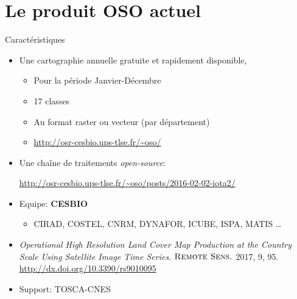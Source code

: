 \documentclass[pressentation,10pt,aspectratio=1610, xcolor=table]{beamer}
\begin{document}
\section{Le produit OSO actuel}
\label{sec:org7da76dc}
\begin{frame}[label={sec:org039e2ee}]{Caractéristiques}
\begin{itemize}
\item Une cartographie annuelle gratuite et rapidement disponible,
\begin{itemize}
\item Pour la période \og Janvier-Décembre\fg
\item 17 classes
\item Au format raster ou vecteur (par département)
\item \url{http://osr-cesbio.ups-tlse.fr/\~oso/}
\end{itemize}
\item Une chaîne de traitements \emph{open-source}:
\begin{center}
\url{http://osr-cesbio.ups-tlse.fr/\~oso/posts/2016-02-02-iota2/} 
\end{center}
\item Equipe: \textbf{CESBIO}
\begin{itemize}
\item CIRAD, COSTEL, CNRM, DYNAFOR, ICUBE, ISPA, MATIS \ldots{}
\end{itemize}
\item \emph{Operational High Resolution Land Cover Map Production at the Country
Scale Using Satellite Image  Time Series}.  \(\textsc{Remote Sens.}\)
2017, 9, 95. \url{http://dx.doi.org/10.3390/rs9010095}
\item Support: TOSCA-CNES
\end{itemize}
\end{frame}
\end{document}
